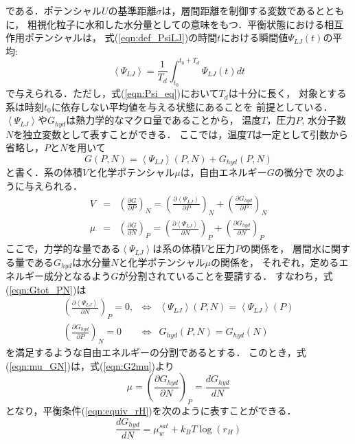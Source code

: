 である．ポテンシャル$U$の基準距離$\sigma$は，層間距離を制御する変数であるとともに，
粗視化粒子に水和した水分量としての意味をもつ．平衡状態における相互作用ポテンシャルは，
式(\ref{eqn:def_PsiLJ})の時間$t$における瞬間値$\Psi_{LJ}(t)$の平均:
\begin{equation}
	\left< \Psi_{LJ}\right>
	=
	\frac{1}{T_d}\int_{t_0}^{t_0+T_d} \Psi_{LJ}(t)dt
	\label{eqn:Psi_eq}
\end{equation}
で与えられる．ただし，式(\ref{eqn:Psi_eq})において$T_d$は十分に長く，
対象とする系は時刻$t_0$に依存しない平均値を与える状態にあることを
前提としている．\\
\hspace{\parindent}
$\left< \Psi_{LJ} \right>$や$G_{hyd}$は熱力学的なマクロ量であることから，
温度$T$，圧力$P$, 水分子数$N$を独立変数として表すことができる．
ここでは，温度$T$は一定として引数から省略し，$P$と$N$を用いて
\begin{equation}
	G(P,N)=\left< \Psi_{LJ} \right>(P,N) +G_{hyd}(P,N)
	\label{eqn:Gtot_PN}
\end{equation}
と書く．系の体積$V$と化学ポテンシャル$\mu$は，自由エネルギー$G$の微分で
次のように与えられる．
\begin{eqnarray}
	V &= & 
	\left( \frac{\partial G}{\partial P} \right)_N 
	=
	\left( \frac{\partial \left< \Psi_{LJ}\right>}{\partial P} \right)_N 
	+
	\left( \frac{\partial G_{hyd}}{\partial P} \right)_N 
	\label{eqn:G2V}
	\\
	\mu &= & \left( \frac{\partial G}{\partial N} \right)_P 
	=
	\left( \frac{\partial \left< \Psi_{LJ}\right>}{\partial N} \right)_P 
	+
	\left( \frac{\partial G_{hyd}}{\partial N} \right)_P 
	\label{eqn:G2mu}
\end{eqnarray}
ここで，力学的な量である$\left<\Psi_{LJ}\right>$は系の体積$V$と圧力$P$の関係を，
層間水に関する量である$G_{hyd}$は水分量$N$と化学ポテンシャル$\mu$の関係を，
それぞれ，定めるエネルギー成分となるよう$G$が分割されていることを要請する．
すなわち，式(\ref{eqn:Gtot_PN})は
\begin{eqnarray}
	\left( \frac{\partial \left< \Psi_{LJ}\right>}{\partial N} \right)_P=0, 
	& \Leftrightarrow & 
	\left< \Psi_{LJ}\right>(P,N) = \left< \Psi_{LJ}\right>(P) 
	\label{eqn:assuption1}
	\\ 
	\left( \frac{\partial G_{hyd}}{\partial P} \right)_N =0
	& \Leftrightarrow & 
	 G_{hyd}(P,N) = G_{hyd}(N) 
	\label{eqn:G2mu}
	\label{eqn:asumption2}
\end{eqnarray}
を満足するような自由エネルギーの分割であるとする．
このとき，式(\ref{eqn:mu_GN})は，式(\ref{eqn:G2mu})より
\begin{equation}
	\mu= \left( \frac{\partial G_{hyd}}{\partial N} \right)_P 
	=
	\frac{dG_{hyd}}{dN}
	\label{eqn:G2mu_2}
\end{equation}
となり，平衡条件(\ref{eqn:equiv_rH})を次のように表すことができる．
\begin{equation}
	\frac{d G_{hyd}}{d N}
	=
	\mu_w^{sat} +k_BT \log \left( r_H \right)
	\label{eqn:mu_hyd}
\end{equation}
